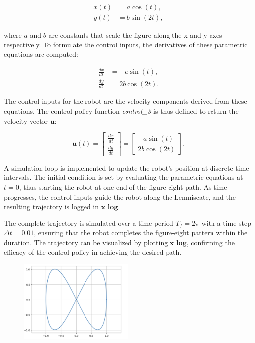 \documentclass[letterpaper, 10 pt, conference]{ieeeconf}  %
\begin{document}
\begin{align}
    x(t) &= a \cos(t), \\
    y(t) &= b \sin(2t),
\end{align}

where \( a \) and \( b \) are constants that scale the figure along the x and y axes respectively. To formulate the control inputs, the derivatives of these parametric equations are computed:

\begin{align}
    \frac{dx}{dt} &= -a \sin(t), \\
    \frac{dy}{dt} &= 2b \cos(2t).
\end{align}

The control inputs for the robot are the velocity components derived from these equations. The control policy function \textit{control\_3} is thus defined to return the velocity vector \( \mathbf{u} \):

\begin{equation}
    \mathbf{u}(t) = \begin{bmatrix}
        \frac{dx}{dt} \\
        \frac{dy}{dt}
    \end{bmatrix} = \begin{bmatrix}
        -a \sin(t) \\
        2b \cos(2t)
    \end{bmatrix}.
\end{equation}

A simulation loop is implemented to update the robot's position at discrete time intervals. The initial condition is set by evaluating the parametric equations at \( t = 0 \), thus starting the robot at one end of the figure-eight path. As time progresses, the control inputs guide the robot along the Lemniscate, and the resulting trajectory is logged in \( \mathbf{x\_log} \).

The complete trajectory is simulated over a time period \( T_f = 2\pi \) with a time step \( \Delta t = 0.01 \), ensuring that the robot completes the figure-eight pattern within the duration. The trajectory can be visualized by plotting \( \mathbf{x\_log} \), confirming the efficacy of the control policy in achieving the desired path.

\begin{figure}[htbp]
    \centering
    \includegraphics[width=0.5\textwidth]{image3.png}
\end{figure}
\end{document}
